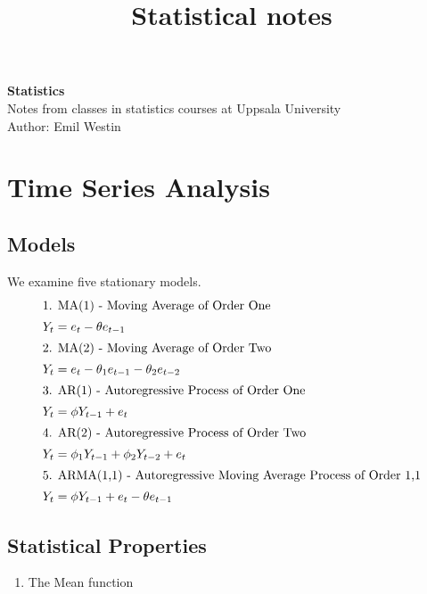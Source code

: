 \documentclass[11pt]{article}
\begin{document}
\title{Statistical notes}

\thispagestyle{empty}

\begin{center}
{\LARGE \bf Statistics}\\
Notes from classes in statistics courses at Uppsala University \\
Author: Emil Westin
\end{center}

\section{Time Series Analysis}
\subsection{Models}

We examine five stationary models.
\begin{align}
\intertext{1. MA(1) - Moving Average of Order One}
Y_t & = e_t - \theta e_{t-1} \label{MA1} \\
\intertext{2. MA(2) - Moving Average of Order Two}
Y_t & = e_t - \theta_1 e_{t-1} -  \theta_2 e_{t-2} \label{MA2} \\
\intertext{3. AR(1) - Autoregressive Process of Order One}
Y_t & = \phi Y_{t-1} + e_t \label{AR1} \\
\intertext{4. AR(2) - Autoregressive Process of Order Two}
Y_t & = \phi_1 Y_{t-1} + \phi_2 Y_{t-2} + e_t \label{AR2} \\
\intertext{5. ARMA(1,1) - Autoregressive Moving Average Process of Order 1,1}
Y_t & = \phi Y_{t-1} + e_t - \theta e_{t-1} \label{ARMA} 
\end{align}

\subsection{Statistical Properties}

\begin{enumerate}
\item The Mean function

\end{enumerate}
\end{document}

